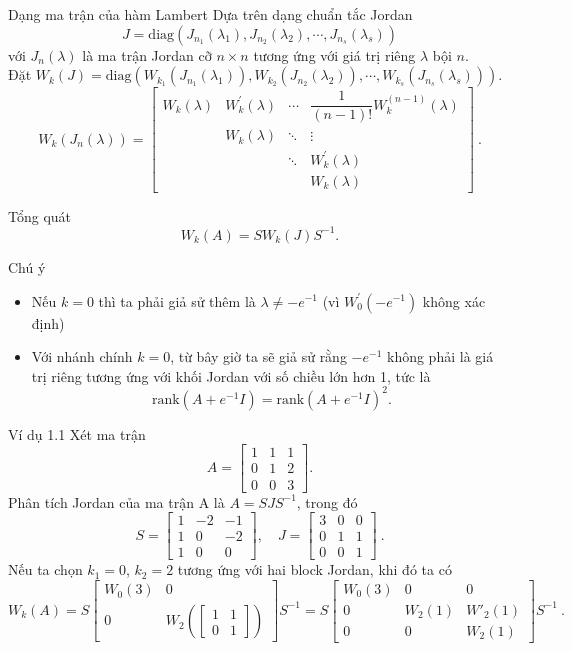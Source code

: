 \documentclass[10pt,notheorems]{beamer}
\theoremstyle{definition}
\theoremstyle{definition}
\theoremstyle{definition}
\newcommand{\m}[1]{
	\begin{bmatrix}
		#1
\end{bmatrix}}
\begin{document}
\begin{frame}{}
\begin{block}{Dạng ma trận của hàm Lambert}
Dựa trên dạng chuẩn tắc Jordan
$$ J=\text{diag}(J_{n_1}(\lambda_1),J_{n_2}(\lambda_2),\cdots,J_{n_s}(\lambda_s))$$
với $J_n(\lambda)$ là ma trận Jordan cỡ $n\times n$ tương ứng với giá trị riêng $\lambda$ bội $n$.\pause \\

Đặt \hspace{0.9cm} $W_k(J)=\text{diag}(W_{k_1}(J_{n_1}(\lambda_1)),W_{k_2}(J_{n_2}(\lambda_2)),\cdots,W_{k_s}(J_{n_s}(\lambda_s))).$
$$ W_k(J_n(\lambda))=\begin{bmatrix}
W_k(\lambda)&W_k^\prime(\lambda)&\cdots & \dfrac{1}{(n-1)!}W_k^{(n-1)}(\lambda)\\
& W_k(\lambda) & \ddots & \vdots\\
& & \ddots & W_k^\prime(\lambda)\\
& &  & W_k(\lambda)
\end{bmatrix}
\ .
$$\pause
\end{block}
\begin{block}{Tổng quát}
	$$W_k(A)=SW_k(J)S^{-1}.$$
\end{block}
\end{frame}


\begin{frame}{}
	\begin{block}{Chú ý}
\begin{itemize}
\item Nếu $k=0$ thì ta phải giả sử thêm là $\lambda\neq -e^{-1}$ (vì $W_0^\prime(-e^{-1})$ không xác định) 
\item Với nhánh chính $k=0$, từ bây giờ ta sẽ giả sử rằng $-e^{-1}$ không phải là giá trị riêng tương ứng với khối Jordan với số chiều lớn hơn 1, tức là
$$\text{rank}(A+e^{-1}I)=\text{rank}(A+e^{-1}I)^2.$$
\end{itemize}
\end{block}
\end{frame}


\begin{frame}{}
\begin{block}{Ví dụ 1.1}\label{vd1.1}
	Xét ma trận
	\[
	A = \m{1 & 1 & 1 \\ 0 & 1 & 2 \\ 0 &  0  &  3}. 
	\]
	Phân tích Jordan của ma trận A là $A = S J S^{-1}$, trong đó
	\[
	S = \m{ 1 &  -2 & -1 \\ 1 &    0  &  -2 \\ 	1  &   0  &   0 }, \quad J = \m{3 &  0 & 0 \\ 0 &  1 &  1 \\ 0 &  0 & 1} \ .
	\]
	Nếu ta chọn $k_1  = 0$, $k_2 = 2$ tương ứng với hai block Jordan, khi đó ta có 
	\[
	W_k(A) = S \m{W_0(3) & 0  \\ 0  & W_2\left( \m{1 &  1 \\ 0 &  1} \right) } S^{-1} 
	= S \m{W_0(3) & 0 & 0 \\ 0  & W_2(1) & W'_2(1) \\  0 & 0  & W_2(1)} S^{-1} \ .
	\]
\end{block}
\end{frame}
\end{document}
